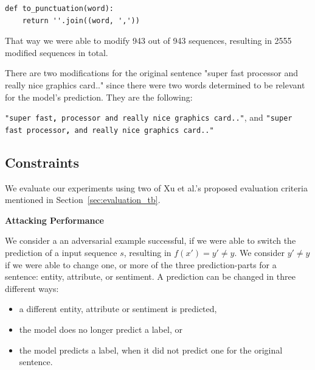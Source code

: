 \begin{lstlisting}
def to_punctuation(word):
    return ''.join((word, ','))
\end{lstlisting}

That way we were able to modify 943 out of 943 sequences, resulting in 2555 modified sequences in total. 

There are two modifications for the original sentence "super fast processor and really nice graphics card.." since there were two words determined to be relevant for the model's prediction. They are the following:

\texttt{"super fast\textbf{,} processor and really nice graphics card.."}, and
\texttt{"super fast processor\textbf{,} and really nice graphics card.."}

\subsection{Constraints}
    \label{sec:constraints_m}

We evaluate our experiments using two of Xu et al.'s proposed evaluation criteria mentioned in Section~\ref{sec:evaluation_tb}. 

\textbf{Attacking Performance}

We consider a an adversarial example successful, if we were able to switch the prediction of a input sequence $s$, resulting in ${f(x') = y' \neq y}$.
We consider ${y' \neq y}$ if we were able to change one, or more of the three prediction-parts for a sentence: entity, attribute, or sentiment. 
A prediction can be changed in three different ways:
\begin{itemize}
\item a different entity, attribute or sentiment is predicted,
\item the model does no longer predict a label, or
\item the model predicts a label, when it did not predict one for the original sentence.
\end{itemize}

